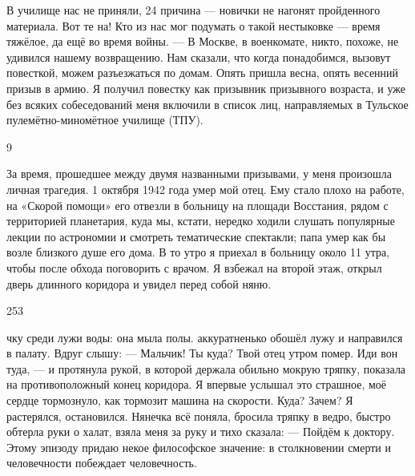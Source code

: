 В училище нас не приняли, 24 причина — новички не нагонят пройденного материала. Вот те на! Кто из нас мог подумать о такой нестыковке — время тяжёлое, да ещё во время войны. — В Москве, в военкомате, никто, похоже, не удивился нашему возвращению. Нам сказали, что когда понадобимся, вызовут повесткой, можем разъезжаться по домам. Опять пришла весна, опять весенний призыв в армию. Я получил повестку как призывник призывного возраста, и уже без всяких собеседований меня включили в список лиц, направляемых в Тульское пулемётно-миномётное училище (ТПУ).

9

За время, прошедшее между двумя названными призывами, у меня произошла личная трагедия. 1 октября 1942 года умер мой отец. Ему стало плохо на работе, на «Скорой помощи» его отвезли в больницу на площади Восстания, рядом с территорией планетария, куда мы, кстати, нередко ходили слушать популярные лекции по астрономии и смотреть тематические спектакли; папа умер как бы возле близкого душе его дома. В то утро я приехал в больницу около 11 утра, чтобы после обхода поговорить с врачом. Я взбежал на второй этаж, открыл дверь длинного коридора и увидел перед собой няню.

253

чку среди лужи воды: она мыла полы. аккуратненько обошёл лужу и направился в палату. Вдруг слышу: — Мальчик! Ты куда? Твой отец утром помер. Иди вон туда, — и протянула рукой, в которой держала обильно мокрую тряпку, показала на противоположный конец коридора. Я впервые услышал это страшное, моё сердце тормознуло, как тормозит машина на скорости. Куда? Зачем? Я растерялся, остановился. Нянечка всё поняла, бросила тряпку в ведро, быстро обтерла руки о халат, взяла меня за руку и тихо сказала: — Пойдём к доктору. Этому эпизоду придаю некое философское значение: в столкновении смерти и человечности побеждает человечность.